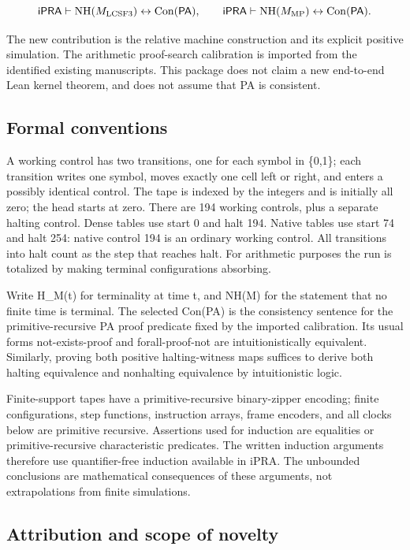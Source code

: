 \documentclass[10pt,a4paper]{article}
\begin{document}
\[
\mathsf{iPRA}\vdash\operatorname{NH}(M_{\rm LCSF3})\leftrightarrow\operatorname{Con}(\mathsf{PA}),
\qquad
\mathsf{iPRA}\vdash\operatorname{NH}(M_{\rm MP})\leftrightarrow\operatorname{Con}(\mathsf{PA}).
\]

The new contribution is the relative machine construction and its explicit positive simulation. The arithmetic proof-search calibration is imported from the identified existing manuscripts. This package does not claim a new end-to-end Lean kernel theorem, and does not assume that PA is consistent.

\subsection{Formal conventions}\label{formal-conventions}

A working control has two transitions, one for each symbol in \{0,1\}; each transition writes one symbol, moves exactly one cell left or right, and enters a possibly identical control. The tape is indexed by the integers and is initially all zero; the head starts at zero. There are 194 working controls, plus a separate halting control. Dense tables use start 0 and halt 194. Native tables use start 74 and halt 254: native control 194 is an ordinary working control. All transitions into halt count as the step that reaches halt. For arithmetic purposes the run is totalized by making terminal configurations absorbing.

Write H\_M(t) for terminality at time t, and NH(M) for the statement that no finite time is terminal. The selected Con(PA) is the consistency sentence for the primitive-recursive PA proof predicate fixed by the imported calibration. Its usual forms not-exists-proof and forall-proof-not are intuitionistically equivalent. Similarly, proving both positive halting-witness maps suffices to derive both halting equivalence and nonhalting equivalence by intuitionistic logic.

Finite-support tapes have a primitive-recursive binary-zipper encoding; finite configurations, step functions, instruction arrays, frame encoders, and all clocks below are primitive recursive. Assertions used for induction are equalities or primitive-recursive characteristic predicates. The written induction arguments therefore use quantifier-free induction available in iPRA. The unbounded conclusions are mathematical consequences of these arguments, not extrapolations from finite simulations.

\subsection{Attribution and scope of novelty}\label{attribution-and-scope-of-novelty}
\end{document}
